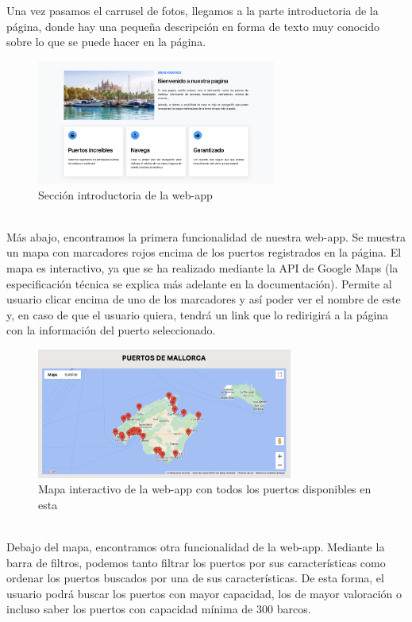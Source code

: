 \documentclass{article}
\begin{document}
\noindent Una vez pasamos el carrusel de fotos, llegamos a la parte introductoria de la página, donde hay una pequeña descripción en forma de texto muy conocido sobre lo que se puede hacer en la página.
\begin{figure}[ht]
    \centering
    \includegraphics[width=0.7\textwidth]{images/introduccion.png}
    \caption{Sección introductoria de la web-app}
\end{figure}
\\Más abajo, encontramos la primera funcionalidad de nuestra web-app. Se muestra un mapa con marcadores rojos encima de los puertos registrados en la página. El mapa es interactivo, ya que se ha realizado mediante la API de Google Maps (la especificación técnica se explica más adelante en la documentación). Permite al usuario clicar encima de uno de los marcadores y así poder ver el nombre de este y, en caso de que el usuario quiera, tendrá un link que lo redirigirá a la página con la información del puerto seleccionado.
\begin{figure}[ht]
    \centering
    \includegraphics[width=0.75\textwidth]{images/mapa.png}
    \caption{Mapa interactivo de la web-app con todos los puertos disponibles en esta}
\end{figure}
\\Debajo del mapa, encontramos otra funcionalidad de la web-app. Mediante la barra de filtros, podemos tanto filtrar los puertos por sus características como ordenar los puertos buscados por una de sus características. De esta forma, el usuario podrá buscar los puertos con mayor capacidad, los de mayor valoración o incluso saber los puertos con capacidad mínima de 300 barcos.\\
\end{document}

